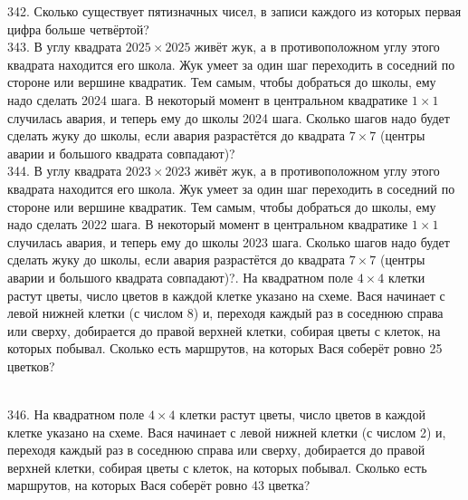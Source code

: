 \documentclass[12pt]{article}
\begin{document}
342. Сколько существует пятизначных чисел, в записи каждого из которых первая цифра больше четвёртой?\\
343. В углу квадрата $2025\times2025$ живёт жук, а в противоположном углу этого квадрата находится его школа. Жук умеет за один шаг переходить в соседний по стороне или вершине квадратик. Тем самым, чтобы добраться до школы, ему надо сделать 2024 шага. В некоторый момент в центральном квадратике $1\times1$ случилась авария, и теперь ему до школы 2024 шага. Сколько шагов надо будет сделать жуку до школы, если авария разрастётся до квадрата $7\times7$ (центры аварии и большого квадрата совпадают)?\\
344. В углу квадрата $2023\times2023$ живёт жук, а в противоположном углу этого квадрата находится его школа. Жук умеет за один шаг переходить в соседний по стороне или вершине квадратик. Тем самым, чтобы добраться до школы, ему надо сделать 2022 шага. В некоторый момент в центральном квадратике $1\times1$ случилась авария, и теперь ему до школы 2023 шага. Сколько шагов надо будет сделать жуку до школы, если авария разрастётся до квадрата $7\times7$ (центры аварии и большого квадрата совпадают)?\newpage{}. На квадратном поле $4\times4$ клетки растут цветы, число цветов в каждой клетке указано на схеме. Вася начинает с левой нижней клетки (с числом 8) и, переходя каждый раз в соседнюю справа или сверху, добирается до правой верхней клетки, собирая цветы с клеток, на которых побывал. Сколько есть маршрутов, на которых Вася соберёт ровно 25 цветков?\\
\begin{figure}[ht!]
\end{figure}\\
346. На квадратном поле $4\times4$ клетки растут цветы, число цветов в каждой клетке указано на схеме. Вася начинает с левой нижней клетки (с числом 2) и, переходя каждый раз в соседнюю справа или сверху, добирается до правой верхней клетки, собирая цветы с клеток, на которых побывал. Сколько есть маршрутов, на которых Вася соберёт ровно 43 цветка?\\
\end{document}

